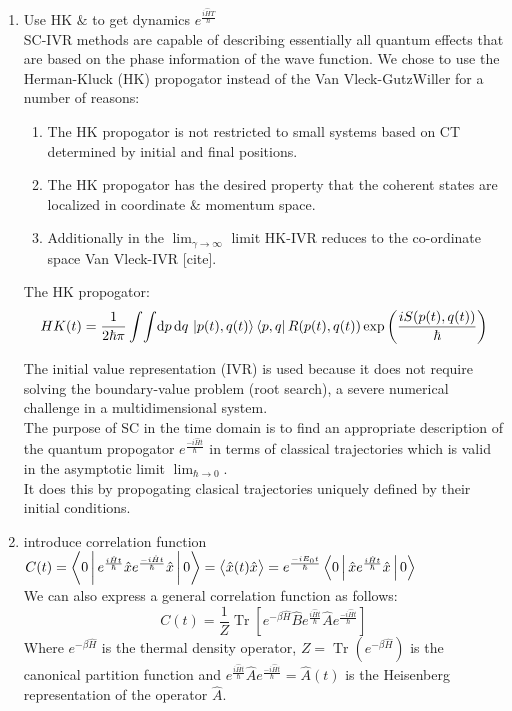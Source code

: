 \documentclass[12pt,letterpaper,oneside,final,titlepage]{article}               %
\numberwithin{equation}{section} %
\DeclareMathOperator{\Tr}{Tr}
\begin{document}
\begin{enumerate}
    \item Use HK $\&$ to get dynamics $e^{\frac{i\hat{H}T}{\hbar}}$ \\
    SC-IVR methods are capable of describing essentially all quantum effects that are based on the phase information of the wave function.
    We chose to use the Herman-Kluck (HK) propogator instead of the Van Vleck-GutzWiller for a number of reasons:
    \begin{enumerate}
        \item The HK propogator is not restricted to small systems based on CT determined by initial and final positions.
        \item The HK propogator has the desired property that the coherent states are localized in coordinate $\&$ momentum space.
        \item Additionally in the $\lim_{\gamma \to \infty}$ limit HK-IVR reduces to the co-ordinate space Van Vleck-IVR [cite]. 
    \end{enumerate}
    The HK propogator:
    \begin{equation}
        HK(t) = \frac{1}{2\hbar\pi}\int\!\int \!\dif p\,\!\dif q\, 
        \ket{p(t), q(t)}\bra{p,q} R(p(t),q(t))
        \exp{\left(\frac{iS(p(t),q(t))}{\hbar}\right)}
    \end{equation}

    The initial value representation (IVR) is used because it does not require solving the boundary-value problem (root search), a severe numerical challenge in a multidimensional system. \\
    The purpose of SC in the time domain is to find an appropriate description of the quantum propogator $e^{\frac{-i\hat{H}t}{\hbar}}$ 
    in terms of classical trajectories which is valid in the asymptotic limit $\lim_{\hbar \to 0}$. \\
    It does this by propogating clasical trajectories uniquely defined by their initial conditions.

    \item introduce correlation function $C(t) = \Braket{0|e^{\frac{i\hat{H}t}{\hbar}}\hat{x}e^{\frac{-i\hat{H}t}{\hbar}}\hat{x}|0} 
                                               = \Braket{\hat{x}(t)\hat{x}} 
                                               = e^{\frac{-iE_{0}t}{\hbar}}\Braket{0|\hat{x}e^{\frac{i\hat{H}t}{\hbar}}\hat{x}|0}$\\
    We can also express a general correlation function as follows:
    \begin{equation}
        C(t) = \frac{1}{Z}\Tr[e^{-\beta\hat{H}}\hat{B}e^{\frac{i\hat{H}t}{\hbar}}\hat{A}e^{\frac{-i\hat{H}t}{\hbar}}]
    \end{equation}
    Where $e^{-\beta\hat{H}}$ is the thermal density operator, $Z = \Tr(e^{-\beta\hat{H}})$ is the canonical partition function 
    and $e^{\frac{i\hat{H}t}{\hbar}}\hat{A}e^{\frac{-i\hat{H}t}{\hbar}}=\hat{A}(t)$ is the Heisenberg representation of the operator $\hat{A}$.
\end{enumerate}
\end{document}
